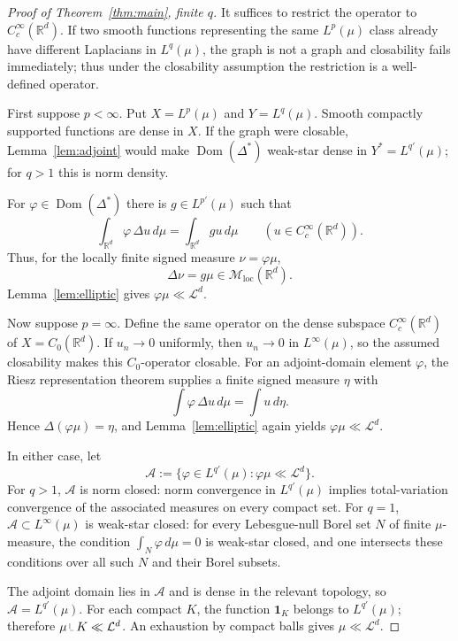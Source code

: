 \documentclass[11pt]{article}
\newcommand{\R}{\mathbb R}
\newcommand{\Leb}{\mathcal L}
\newcommand{\Mloc}{\mathcal M_{\mathrm{loc}}}
\newcommand{\Dom}{\operatorname{Dom}}
\begin{document}
\begin{proof}[Proof of Theorem~\ref{thm:main}, finite $q$]
It suffices to restrict the operator to $C_c^\infty(\R^d)$.
If two smooth functions representing the same $L^p(\mu)$ class already have
different Laplacians in $L^q(\mu)$, the graph is not a graph and closability
fails immediately; thus under the closability assumption the restriction is a
well-defined operator.

First suppose $p<\infty$.  Put $X=L^p(\mu)$ and $Y=L^q(\mu)$.  Smooth
compactly supported functions are dense in $X$.  If the graph were closable,
Lemma~\ref{lem:adjoint} would make $\Dom(\Delta^*)$ weak-star dense in
$Y^*=L^{q'}(\mu)$; for $q>1$ this is norm density.

For $\varphi\in\Dom(\Delta^*)$ there is $g\in L^{p'}(\mu)$ such that
\[
 \int_{\R^d}\varphi\,\Delta u\,d\mu
 =\int_{\R^d}g u\,d\mu
 \qquad (u\in C_c^\infty(\R^d)).
\]
Thus, for the locally finite signed measure $\nu=\varphi\mu$,
\[
 \Delta\nu=g\mu\in\Mloc(\R^d).
\]
Lemma~\ref{lem:elliptic} gives $\varphi\mu\ll\Leb^d$.

Now suppose $p=\infty$.  Define the same operator on the dense subspace
$C_c^\infty(\R^d)$ of $X=C_0(\R^d)$.  If $u_n\to0$ uniformly, then
$u_n\to0$ in $L^\infty(\mu)$, so the assumed closability makes this
$C_0$-operator closable.  For an adjoint-domain element $\varphi$, the Riesz
representation theorem supplies a finite signed measure $\eta$ with
\[
 \int\varphi\,\Delta u\,d\mu=\int u\,d\eta.
\]
Hence $\Delta(\varphi\mu)=\eta$, and Lemma~\ref{lem:elliptic} again yields
$\varphi\mu\ll\Leb^d$.

In either case, let
\[
 \mathcal A:=\{\varphi\in L^{q'}(\mu):\varphi\mu\ll\Leb^d\}.
\]
For $q>1$, $\mathcal A$ is norm closed: norm convergence in $L^{q'}(\mu)$
implies total-variation convergence of the associated measures on every
compact set.  For $q=1$, $\mathcal A\subset L^\infty(\mu)$ is weak-star
closed: for every Lebesgue-null Borel set $N$ of finite $\mu$-measure, the
condition $\int_N\varphi\,d\mu=0$ is weak-star closed, and one intersects these
conditions over all such $N$ and their Borel subsets.

The adjoint domain lies in $\mathcal A$ and is dense in the relevant topology,
so $\mathcal A=L^{q'}(\mu)$.  For each compact $K$, the function
$\mathbf1_K$ belongs to $L^{q'}(\mu)$; therefore
$\mu\mathbin{\vrule height 1.4ex depth -0.3ex width 0.07ex\vrule height 0.07ex depth -0.02ex width 0.7ex}K\ll\Leb^d$.
An exhaustion by compact balls gives $\mu\ll\Leb^d$.
\end{proof}
\end{document}
